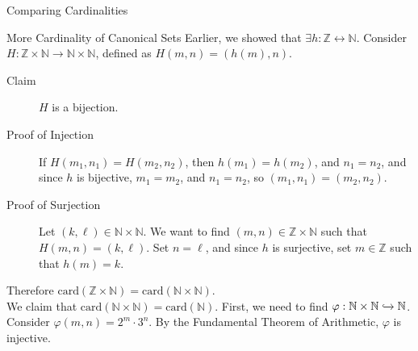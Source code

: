 \documentclass[10pt]{extarticle}
\begin{document}
\begin{problem}{Comparing Cardinalities}
\begin{problem}{More Cardinality of Canonical Sets}
      Earlier, we showed that $\exists h: \mathbb{Z} \leftrightarrow \mathbb{N}$. Consider $H: \mathbb{Z} \times \mathbb{N} \rightarrow \mathbb{N} \times\mathbb{N}$, defined as $H(m,n) = (h(m),n)$. 
      \begin{description}
        \item[Claim] $H$ is a bijection.
        \item[Proof of Injection] If $H(m_1,n_1) = H(m_2,n_2)$, then $h(m_1) = h(m_2)$, and $n_1 = n_2$, and since $h$ is bijective, $m_1 = m_2$, and $n_1 = n_2$, so $(m_1,n_1) = (m_2,n_2)$.
        \item[Proof of Surjection] Let $(k,\ell)\in \mathbb{N} \times \mathbb{N}$. We want to find $(m,n)\in \mathbb{Z}\times \mathbb{N}$ such that $H(m,n) = (k,\ell)$. Set $n = \ell$, and since $h$ is surjective, set $m\in \mathbb{Z}$ such that $h(m) = k$.
      \end{description}
      Therefore $\text{card}(\mathbb{Z} \times \mathbb{N}) = \text{card}(\mathbb{N}\times \mathbb{N})$.\\

      We claim that $\text{card}(\mathbb{N} \times \mathbb{N}) = \text{card}(\mathbb{N})$. First, we need to find $\varphi: \mathbb{N}\times \mathbb{N} \xhookrightarrow{} \mathbb{N}$. Consider $\varphi(m,n) = 2^m\cdot 3^n$. By the Fundamental Theorem of Arithmetic, $\varphi$ is injective.\\


\end{problem}
\end{problem}
\end{document}
